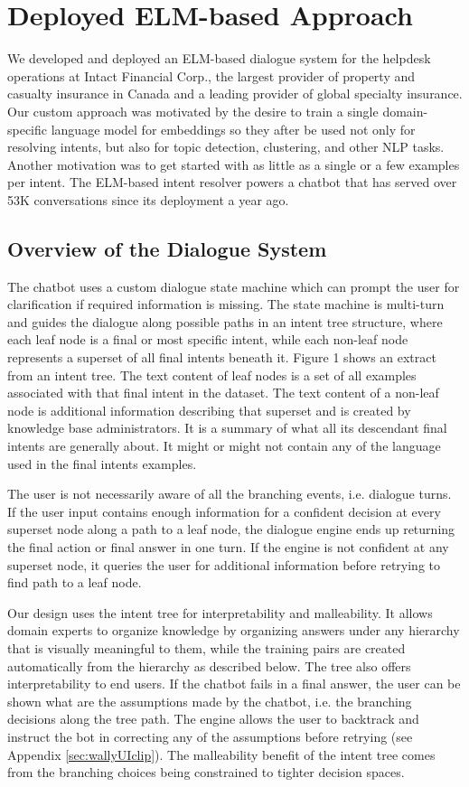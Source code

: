 \documentclass[sigconf, anonymous=true]{acmart}
\begin{document}
\section{Deployed ELM-based Approach}
We developed and deployed an ELM-based dialogue system for the helpdesk operations at Intact Financial Corp., the largest provider of property and casualty insurance in Canada and a leading provider of global specialty insurance. Our custom approach was motivated by the desire to train a single domain-specific language model for embeddings so they after be used not only for resolving intents, but also for topic detection, clustering, and other NLP tasks. Another motivation was to get started with as little as a single or a few examples per intent. The ELM-based intent resolver powers a chatbot that has served over 53K conversations since its deployment a year ago.

\subsection{Overview of the Dialogue System}
\label{chabotOverview}
The chatbot uses a custom dialogue state machine which can prompt the user for clarification if required information is missing. The state machine is multi-turn and guides the dialogue along possible paths in an intent tree structure, where each leaf node is a final or most specific intent, while each non-leaf node represents a superset of all final intents beneath it. Figure 1 shows an extract from an intent tree. The text content of leaf nodes is a set of all examples associated with that final intent in the dataset. The text content of a non-leaf node is additional information describing that superset and is created by knowledge base administrators. It is a summary of what all its descendant final intents are generally about. It might or might not contain any of the language used in the final intents examples.  

The user is not necessarily aware of all the branching events, i.e. dialogue turns. If the user input contains enough information for a confident decision at every superset node along a path to a leaf node, the dialogue engine ends up returning the final action or final answer in one turn. If the engine is not confident at any superset node, it queries the user for additional information before retrying to find path to a leaf node. 

Our design uses the intent tree for interpretability and malleability. It allows domain experts to organize knowledge by organizing answers under any hierarchy that is visually meaningful to them, while the training pairs are created automatically from the hierarchy as described below. The tree also offers interpretability to end users. If the chatbot fails in a final answer, the user can be shown what are the assumptions made by the chatbot, i.e. the branching decisions along the tree path. The engine allows the user to backtrack and instruct the bot in correcting any of the assumptions before retrying (see Appendix \ref{sec:wallyUIclip}). The malleability benefit of the intent tree comes from the branching choices being constrained to tighter decision spaces. 
 
\end{document}
